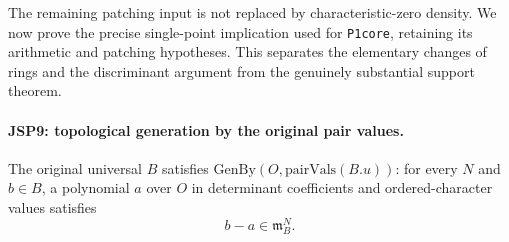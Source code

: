 The remaining patching input is not replaced by characteristic-zero
density. We now prove the precise single-point implication used for
\texttt{P1core}, retaining its arithmetic and patching hypotheses.
This separates the elementary changes of rings and the discriminant
argument from the genuinely substantial support theorem.

\paragraph{JSP9: topological generation by the original pair values.}
\label{claim:JSP9}
The original universal $B$ satisfies
$\mathrm{GenBy}(O,\mathrm{pairVals}(B.u))$: for every $N$ and
$b\in B$, a polynomial $a$ over $O$ in determinant coefficients
and ordered-character values satisfies
\[
                         b-a\in\mathfrak m_B^N.       \tag{JSP.14}
\]
